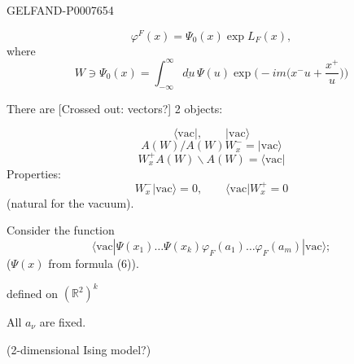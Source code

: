 \begin{GelfandAdjacentEvidence}{GELFAND-P000765}{4}

\begin{equation*}
\tag{15}
\varphi^F(x)=\Psi_0(x)\exp L_F(x),
\end{equation*}
where
\begin{equation*}
\tag{16}
W\ni\Psi_0(x)=\int_{-\infty}^{\infty}\underline{du}\,\Psi(u)
\exp\biggl(-im\biggl(x^-u+\frac{x^+}{u}\biggr)\biggr)
\end{equation*}

There are [Crossed out: vectors?] 2 objects:
\end{GelfandAdjacentEvidence}

\[
\langle \mathrm{vac}|,\qquad |\mathrm{vac}\rangle
\]
\begin{equation*}
\tag*{\((17)_1\)}
A(W)/A(W)W_x^-=|\mathrm{vac}\rangle
\end{equation*}
\begin{equation*}
\tag*{\((17)_2\)}
W_x^+A(W)\backslash A(W)=\langle\mathrm{vac}|
\end{equation*}
Properties:
\begin{equation*}
\tag{18}
W_x^-|\mathrm{vac}\rangle=0,\qquad\langle\mathrm{vac}|W_x^+=0
\end{equation*}
(natural for the vacuum).

Consider the function
\begin{equation*}
\tag{19}
\langle\mathrm{vac}|\Psi(x_1)\ldots
\Psi(x_k)\varphi_F(a_1)\ldots\varphi_F(a_m)|\mathrm{vac}\rangle;
\end{equation*}
(\(\Psi(x)\) from formula (6)).

defined on \((\mathbb R^2)^k\)

All \(a_\nu\) are fixed.

(2-dimensional Ising model?)


